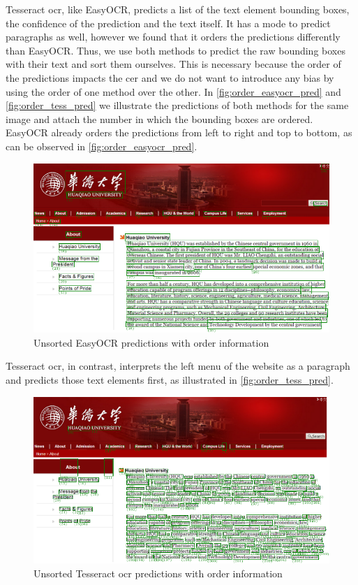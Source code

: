 Tesseract \gls{ocr}, like EasyOCR, predicts a list of the text element bounding boxes, the confidence of the prediction and the text itself.
It has a mode to predict paragraphs as well, however we found that it orders the predictions differently than EasyOCR.
Thus, we use both methods to predict the raw bounding boxes with their text and sort them ourselves.
This is necessary because the order of the predictions impacts the \gls{cer} and we do not want to introduce any bias by using the order of one method over the other.
In \autoref{fig:order_easyocr_pred} and \autoref{fig:order_tess_pred} we illustrate the predictions of both methods for the same image and attach the number in which the bounding boxes are ordered.
EasyOCR already orders the predictions from left to right and top to bottom, as can be observed in \autoref{fig:order_easyocr_pred}.
\begin{figure}[h!]
    \centering
    \includegraphics[width=\textwidth]{../images/bbox_order_ezocr.pdf}
    \caption{Unsorted EasyOCR predictions with order information}
    \label{fig:order_easyocr_pred}
\end{figure}
Tesseract \gls{ocr}, in contrast, interprets the left menu of the website as a paragraph and predicts those text elements first, as illustrated in \autoref{fig:order_tess_pred}.
\begin{figure}[h!]
    \centering
    \includegraphics[width=\textwidth]{../images/bbox_order_tess.pdf}
    \caption{Unsorted Tesseract \gls{ocr} predictions with order information}
    \label{fig:order_tess_pred}
\end{figure}
